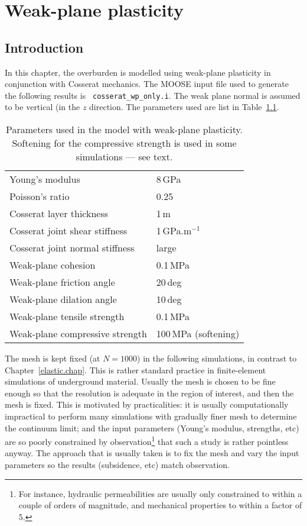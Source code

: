 \documentclass[]{scrreprt}
\begin{document}
\chapter{Weak-plane plasticity}

\section{Introduction}
In this chapter, the overburden is modelled using weak-plane
plasticity in conjunction with Cosserat mechanics.  The MOOSE input
file used to generate the following results is {\tt
  cosserat\_wp\_only.i}.  The weak plane
normal is assumed to be vertical (in the $z$ direction.  The parameters
used are list in Table~\ref{wp.params.tab}.

\begin{table}[htb]
\begin{center}
\begin{tabular}{ll}
Young's modulus & 8\,GPa \\
Poisson's ratio & 0.25 \\
Cosserat layer thickness & 1\,m \\
Cosserat joint shear stiffness & 1\,GPa.m$^{-1}$ \\
Cosserat joint normal stiffness & large \\
Weak-plane cohesion & 0.1\,MPa \\
Weak-plane friction angle & 20\,deg \\
Weak-plane dilation angle & 10\,deg \\
Weak-plane tensile strength & 0.1\,MPa \\
Weak-plane compressive strength & 100\,MPa (softening)
\end{tabular}
\caption{Parameters used in the model with weak-plane plasticity.
  Softening for the compressive strength is used in some simulations
  --- see text.}
\label{wp.params.tab}
\end{center}
\end{table}

The mesh is kept fixed (at $N=1000$) in the following simulations, in
contrast to Chapter~\ref{elastic.chap}.  This is rather standard practice in
finite-element simulations of underground material.  Usually the mesh
is chosen to be fine enough so that the resolution is adequate in the
region of interest, and then the mesh is fixed.  This is
motivated by practicalities: it is usually computationally impractical
to perform many simulations with gradually finer mesh to determine the
continuum limit; and the input parameters (Young's modulus, strengths,
etc) are so poorly constrained by observation\footnote{For instance,
  hydraulic permeabilities are usually only constrained to within a
  couple of orders of magnitude, and mechanical properties to within a
  factor of 5.}  that such a study is rather pointless anyway.  The
approach that is usually taken is to fix the mesh and vary the input
parameters so the results (subsidence, etc) match observation.
\end{document}
